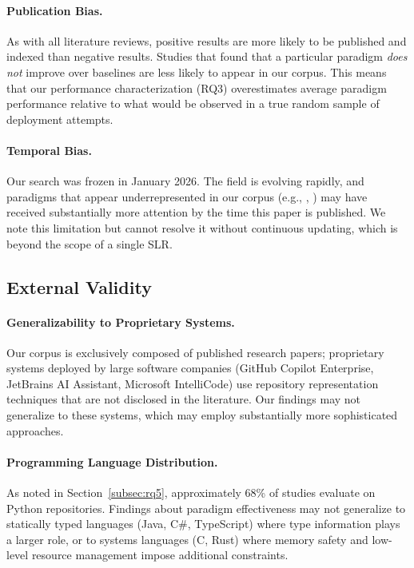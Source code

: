 \paragraph{Publication Bias.}
As with all literature reviews, positive results are more likely to be published and indexed
than negative results. Studies that found that a particular paradigm \emph{does not} improve
over baselines are less likely to appear in our corpus. This means that our performance
characterization (RQ3) overestimates average paradigm performance relative to what would be
observed in a true random sample of deployment attempts.

\paragraph{Temporal Bias.}
Our search was frozen in January 2026. The field is evolving rapidly, and paradigms that
appear underrepresented in our corpus (e.g., , ) may have received
substantially more attention by the time this paper is published. We note this limitation but
cannot resolve it without continuous updating, which is beyond the scope of a single SLR.

\subsection{External Validity}

\paragraph{Generalizability to Proprietary Systems.}
Our corpus is exclusively composed of published research papers; proprietary systems deployed
by large software companies (GitHub Copilot Enterprise, JetBrains AI Assistant, Microsoft
IntelliCode) use repository representation techniques that are not disclosed in the literature.
Our findings may not generalize to these systems, which may employ substantially more
sophisticated approaches.

\paragraph{Programming Language Distribution.}
As noted in Section~\ref{subsec:rq5}, approximately 68\% of studies evaluate on Python
repositories. Findings about paradigm effectiveness may not generalize to statically typed
languages (Java, C\#, TypeScript) where type information plays a larger role, or to systems
languages (C, Rust) where memory safety and low-level resource management impose additional
constraints.

